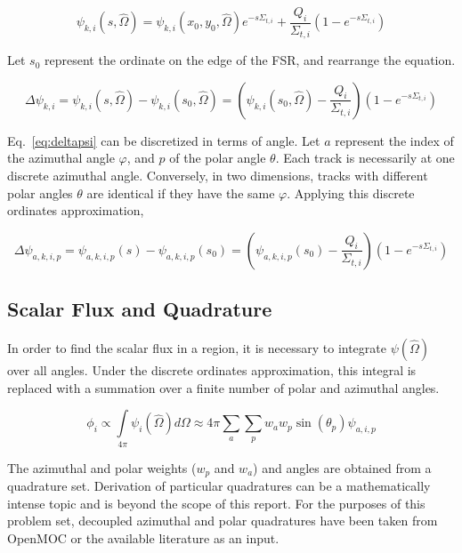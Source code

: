 \documentclass[12pt]{article}
\begin{document}
\begin{equation}\label{eq:fsr2}
\psi_{k,i}(s, \hat{\Omega}) = 
\psi_{k,i}(x_0, y_0, \hat{\Omega}) e^{-s \Sigma_{t,i}} + 
\frac{Q_i}{\Sigma_{t,i}}
\left(1 - e^{-s \Sigma_{t,i}} \right)
\end{equation}

Let $s_0$ represent the ordinate on the edge of the FSR, and rearrange the equation. 

\begin{equation}\label{eq:deltapsi}
\Delta \psi_{k,i} = 
\psi_{k,i}(s, \hat{\Omega}) - \psi_{k,i}(s_0, \hat{\Omega}) = 
\left( \psi_{k,i}(s_0, \hat{\Omega}) - \frac{Q_i}{\Sigma_{t,i}} \right)
\left( 1 - e^{-s \Sigma_{t,i}} \right)
\end{equation}

Eq.~\ref{eq:deltapsi} can be discretized in terms of angle. Let $a$ represent the index of the azimuthal angle $\varphi$, and $p$ of the polar angle $\theta$. Each track is necessarily at one discrete azimuthal angle. Conversely, in two dimensions, tracks with different polar angles $\theta$ are identical if they have the same $\varphi$. Applying this discrete ordinates approximation,

\begin{equation}\label{eq:discord}
\Delta \psi_{a,k,i,p} = 
\psi_{a,k,i,p}(s) - \psi_{a,k,i,p}(s_0) = 
\left( \psi_{a,k,i,p}(s_0) - \frac{Q_i}{\Sigma_{t,i}} \right)
\left( 1 - e^{-s \Sigma_{t,i}} \right)
\end{equation}


\subsection{Scalar Flux and Quadrature}\label{sec:quad}

In order to find the scalar flux in a region, it is necessary to integrate $\psi({\hat{\Omega}})$ over all angles. Under the discrete ordinates approximation, this integral is replaced with a summation over a finite number of polar and azimuthal angles.

\begin{equation}\label{eq:summation}
\phi_{i} \propto  
\int\limits_{4\pi} \psi_{i}({\hat{\Omega}}) d\Omega \approx 
4\pi \sum\limits_a \sum\limits_p w_a w_p \sin(\theta_p) \psi_{a,i,p}
\end{equation}

The azimuthal and polar weights ($w_p$ and $w_a$) and angles are obtained from a quadrature set. Derivation of particular quadratures can be a mathematically intense topic and is beyond the scope of this report. For the purposes of this problem set, decoupled azimuthal and polar quadratures have been taken from OpenMOC or the available literature as an input.
\end{document}
